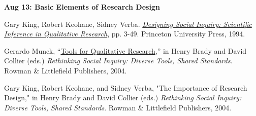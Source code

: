 \documentclass[letterpaper]{article}
\renewenvironment{itemize}{
  \begin{list}{}{
    \setlength{\leftmargin}{1.5em}
  }
}{
  \end{list}
}
\begin{document}
\begin{enumerate}
	\begin{itemize}
		\item {\bf Aug 13: Basic Elements of Research Design}
		\begin{itemize}
			\item[$\bullet$] Gary King, Robert Keohane, Sidney Verba. \href{https://sites.duke.edu/niou/files/2014/06/king94book.pdf}{\emph{Designing Social Inquiry: Scientific Inference in Qualitative Research}}, pp. 3-49. Princeton University Press, 1994.
			\item[$\bullet$] Gerardo Munck, ``\href{https://www.researchgate.net/profile/Gerardo_Munck/publication/275658363_Tools_for_Qualitative_Research/links/5543d6aa0cf23ff71685246b/Tools-for-Qualitative-Research.pdf?_sg%5B0%5D=r_R0BVrbsZuiuUXoAJ0eTIfTaBGDEmHwU9Fvy4Iy84l1eEXqwnkOwNaxe4H3GrNHCW_-JejGObDf18Hd0q4xGQ.bhboK7u6gIPsRQjPj9MO00N3wm97omzXr30hewGtE8ZkeuycaF6m-lRDEsnccltioSavZt3o-DFMdyIdbAwolw&_sg%5B1%5D=k17BN3VARUYm3n_uwfSOMdFxcWWaz3MKHTNzc4Qsmr2oipNZDi9zhpyXXhBLeS4OaCOYox1jNLjN-U81wEptAsy92oFLbTsIKkIJLmgLxLW7.bhboK7u6gIPsRQjPj9MO00N3wm97omzXr30hewGtE8ZkeuycaF6m-lRDEsnccltioSavZt3o-DFMdyIdbAwolw&_iepl=}{Tools for Qualitative Research},'' in  Henry Brady and David Collier (eds.) \emph{Rethinking Social Inquiry: Diverse Tools, Shared Standards}. Rowman \& Littlefield Publishers, 2004.
			\item[$\bullet$] Gary King, Robert Keohane, and Sidney Verba, "The Importance of Research Design," in  Henry Brady and David Collier (eds.) \emph{Rethinking Social Inquiry: Diverse Tools, Shared Standards}. Rowman \& Littlefield Publishers, 2004. 
		\end{itemize}
	\end{itemize}


~\\
\item[] \begin{center}{\color{blue}{\bf Wednesday August 15, National Holiday: No class.}}\end{center}
~\\


\end{enumerate}
\end{document}
